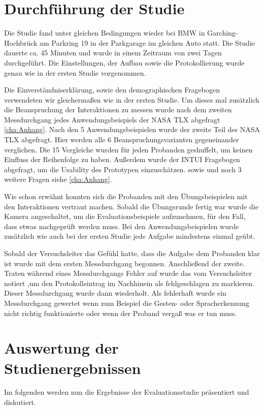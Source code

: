 \section[Durchführung der Studie]{Durchführung der Studie}
Die Studie fand unter gleichen Bedingungen wieder bei BMW in Garching-Hochbrück am Parkring 19 in der Parkgarage im gleichen Auto statt. Die Studie dauerte ca. 45 Minuten und wurde in einem Zeitraum von zwei Tagen durchgeführt. Die Einstellungen, der Aufbau sowie die Protokollierung wurde genau wie in der ersten Studie vorgenommen. 

Die Einverständniserklärung, sowie den demographischen Fragebogen verwendeten wir gleichermaßen wie in der ersten Studie. Um dieses mal zusätzlich die Beanspruchung der Interaktionen zu messen wurde nach dem zweiten Messdurchgang jedes Anwendungsbeispiels der NASA TLX abgefragt \ref{cha:Anhang}. Nach den 5 Anwendungsbeispielen wurde der zweite Teil des NASA TLX abgefragt. Hier werden alle 6 Beanspruchungsvarianten gegeneinander verglichen. Die 15 Vergleiche wurden für jeden Probanden geshuffelt, um keinen Einfluss der Reihenfolge zu haben. Außerdem wurde der INTUI Fragebogen abgefragt, um die Usability des Prototypen einzuschätzen. sowie und noch 3 weitere Fragen siehe \ref{cha:Anhang}. 

Wie schon erwähnt konnten sich die Probanden mit den Übungsbeispielen mit den Interaktionen vertraut machen. Sobald die Übungsrunde fertig war wurde die Kamera angeschaltet, um die Evaluationsbeispiele aufzunehmen, für den Fall, dass etwas nachgeprüft werden muss. Bei den Anwendungsbeispielen wurde zusätzlich wie auch bei der ersten Studie jede Aufgabe mindestens einmal geübt. 

Sobald der Versuchsleiter das Gefühl hatte, dass die Aufgabe dem Probanden klar ist wurde mit dem ersten Messdurchgang begonnen. Anschließend der zweite. Traten während eines Messdurchgangs Fehler auf wurde das vom Versuchsleiter notiert ,um den Protokolleintrag im Nachhinein als fehlgeschlagen zu markieren. Dieser Messdurchgang wurde dann wiederholt. Als fehlerhaft wurde ein Messdurchgang gewertet wenn zum Beispiel die Gesten- oder Spracherkennung nicht richtig funktionierte oder wenn der Proband vergaß was er tun muss. 

\section[Auswertung der Studienergebnissen]{Auswertung der Studienergebnissen}
Im folgenden werden nun die Ergebnisse der Evaluationsstudie präsentiert und diskutiert. 
